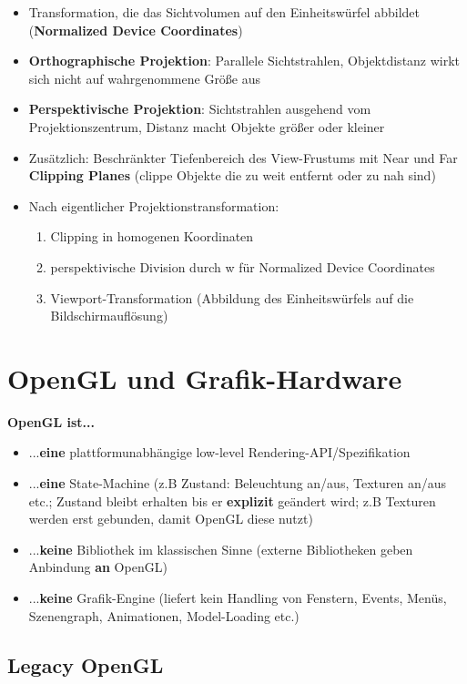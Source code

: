 \documentclass[10pt,a4paper]{article}
\begin{document}
	\begin{itemize}
		\item Transformation, die das Sichtvolumen auf den Einheitswürfel abbildet (\textbf{Normalized Device Coordinates})
		\item \textbf{Orthographische Projektion}: Parallele Sichtstrahlen, Objektdistanz wirkt sich nicht auf wahrgenommene Größe aus
		\item \textbf{Perspektivische Projektion}: Sichtstrahlen ausgehend vom Projektionszentrum, Distanz macht Objekte größer oder kleiner
		\item Zusätzlich: Beschränkter Tiefenbereich des View-Frustums mit Near und Far \textbf{Clipping Planes} (clippe Objekte die zu weit entfernt oder zu nah sind)
		\item Nach eigentlicher Projektionstransformation:
		\begin{enumerate}
			\item Clipping in homogenen Koordinaten
			\item perspektivische Division durch w für Normalized Device Coordinates
			\item Viewport-Transformation (Abbildung des Einheitswürfels auf die Bildschirmauflösung)
		\end{enumerate}
	\end{itemize}

	\newpage
	\section{OpenGL und Grafik-Hardware}
	\label{gl:sec:opengl_und_grafik_hardware}

	\textbf{OpenGL ist...}
	\begin{itemize}
		\item ...\textbf{eine} plattformunabhängige low-level Rendering-API/Spezifikation
		\item ...\textbf{eine} State-Machine (z.B Zustand: Beleuchtung an/aus, Texturen an/aus etc.; Zustand bleibt erhalten bis er \textbf{explizit} geändert wird; z.B Texturen werden erst \glqq gebunden\grqq, damit OpenGL diese nutzt)
		\item ...\textbf{keine} Bibliothek im klassischen Sinne (externe Bibliotheken geben Anbindung \textbf{an} OpenGL)
		\item ...\textbf{keine} Grafik-Engine (liefert kein Handling von Fenstern, Events, Menüs, Szenengraph, Animationen, Model-Loading etc.)
	\end{itemize}

	\subsection{Legacy OpenGL}
	\label{gl:sub:legacy_opengl}
	
\end{document}
